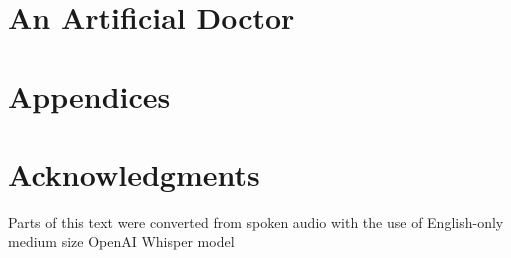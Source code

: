 \newpage
\chapter{An Artificial Doctor} \label{ch:mimicseq}


\newpage
\chapter{Appendices}





\newpage
\chapter{Acknowledgments}

Parts of this text were converted from spoken audio with the use of English-only medium size OpenAI Whisper model \cite{radfordRobustSpeechRecognition2022}

\printbibliography


